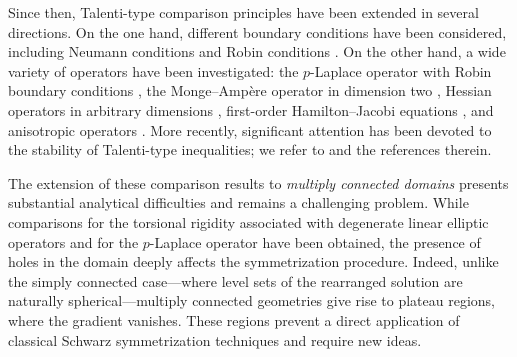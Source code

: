 \documentclass[12pt]{article}
\theoremstyle{definition}
\theoremstyle{plain}
\theoremstyle{definition}
\begin{document}
Since then, Talenti-type comparison principles have been extended in several directions. On the one hand, different boundary conditions have been considered, including Neumann conditions \cite{CNT} and Robin conditions \cite{ANT}. On the other hand, a wide variety of operators have been investigated: the $p$-Laplace operator with Robin boundary conditions \cite{AGM}, the Monge--Ampère operator in dimension two \cite{T81}, Hessian operators in arbitrary dimensions \cite{T89}, first-order Hamilton--Jacobi equations \cite{GN}, and anisotropic operators \cite{DPG,S}. More recently, significant attention has been devoted to the stability of Talenti-type inequalities; we refer to \cite{AL,AB,ABCMP,ABMP,Kim,MS} and the references therein.

The extension of these comparison results to \emph{multiply connected domains} presents substantial analytical difficulties and remains a challenging problem. While comparisons for the torsional rigidity associated with degenerate linear elliptic operators \cite{B} and for the $p$-Laplace operator \cite{AZ,B2} have been obtained, the presence of holes in the domain deeply affects the symmetrization procedure. Indeed, unlike the simply connected case—where level sets of the rearranged solution are naturally spherical—multiply connected geometries give rise to plateau regions, where the gradient vanishes. These regions prevent a direct application of classical Schwarz symmetrization techniques and require new ideas.
\end{document}
